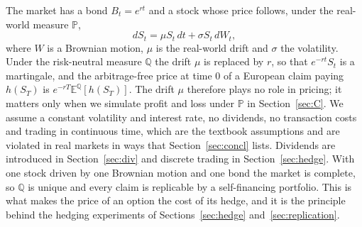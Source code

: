 The market has a bond $B_t=e^{rt}$ and a stock whose price follows, under the real-world measure $\mathbb P$,
\begin{equation}\label{eq:gbm}
 dS_t=\mu S_t\,dt+\sigma S_t\,dW_t,
\end{equation}
where $W$ is a Brownian motion, $\mu$ is the real-world drift and $\sigma$ the volatility.
Under the risk-neutral measure $\mathbb Q$ the drift $\mu$ is replaced by $r$, so that $e^{-rt}S_t$ is a martingale, and the arbitrage-free price at time $0$ of a European claim paying $h(S_T)$ is $e^{-rT}\mathbb E^{\mathbb Q}[h(S_T)]$.
The drift $\mu$ therefore plays no role in pricing; it matters only when we simulate profit and loss under $\mathbb P$ in Section~\ref{sec:C}.
We assume a constant volatility and interest rate, no dividends, no transaction costs and trading in continuous time, which are the textbook assumptions and are violated in real markets in ways that Section~\ref{sec:concl} lists.
Dividends are introduced in Section~\ref{sec:div} and discrete trading in Section~\ref{sec:hedge}.
With one stock driven by one Brownian motion and one bond the market is complete, so $\mathbb Q$ is unique and every claim is replicable by a self-financing portfolio.
This is what makes the price of an option the cost of its hedge, and it is the principle behind the hedging experiments of Sections~\ref{sec:hedge} and~\ref{sec:replication}.

